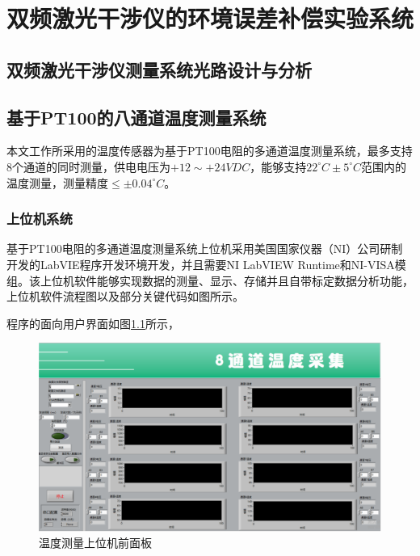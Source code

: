 \chapter{双频激光干涉仪的环境误差补偿实验系统}
\section{双频激光干涉仪测量系统光路设计与分析}
\section{基于PT100的八通道温度测量系统}
本文工作所采用的温度传感器为基于PT100电阻的多通道温度测量系统，最多支持8个通道的同时测量，供电电压为\(+12 \sim +24VDC\)，能够支持\(22^{\circ}C \pm 5^{\circ}C\)范围内的温度测量，测量精度\(\leq \pm 0.04^{\circ}C\)。
\subsection{上位机系统}
基于PT100电阻的多通道温度测量系统上位机采用美国国家仪器（NI）公司研制开发的LabVIE程序开发环境开发，并且需要NI LabVIEW Runtime和NI-VISA模组。该上位机软件能够实现数据的测量、显示、存储并且自带标定数据分析功能，上位机软件流程图以及部分关键代码如图所示。

程序的面向用户界面如图\ref{fig:温度测量上位机前面板}所示，
\begin{figure}[htb]
    \centering
    \includegraphics[width=14cm]{fig/3-fig/温度采集上位机前面板.jpg}
    \caption{温度测量上位机前面板}
    \label{fig:温度测量上位机前面板}
\end{figure}

